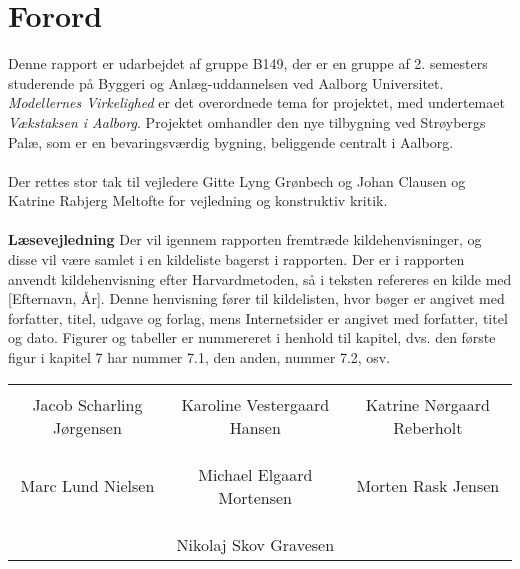 \chapter*{Forord}
Denne rapport er udarbejdet af gruppe B149, der er en gruppe af 2. semesters studerende på Byggeri og Anlæg-uddannelsen ved Aalborg Universitet. \textit{Modellernes Virkelighed} er det overordnede tema for projektet, med undertemaet \textit{Vækstaksen i Aalborg}. Projektet omhandler den nye tilbygning ved Strøybergs Palæ, som er en bevaringsværdig bygning, beliggende centralt i Aalborg. 
\\
\\
Der rettes stor tak til vejledere Gitte Lyng Grønbech og Johan Clausen og Katrine Rabjerg Meltofte for vejledning og konstruktiv kritik. 
\\
\\
\textbf{Læsevejledning}
\newline
Der vil igennem rapporten fremtræde kildehenvisninger, og disse vil være samlet i en kildeliste bagerst i rapporten. Der er i rapporten anvendt kildehenvisning efter Harvardmetoden, så i teksten refereres en kilde med [Efternavn, År]. Denne henvisning fører til kildelisten, hvor bøger er angivet med forfatter, titel, udgave og forlag, mens Internetsider er angivet med forfatter, titel og dato. Figurer og tabeller er nummereret i henhold til kapitel, dvs. den første figur i kapitel 7 har nummer 7.1, den anden, nummer 7.2, osv. 

\phantom{Luft}

\phantom{Luft}

\begin{table}[H]
	\centering
		\begin{tabular}{c c c}
			\underline{\phantom{mmmmmmmmmmmmmm}} & \underline{\phantom{mmmmmmmmmmmmmm}} & \underline{\phantom{mmmmmmmmmmmmmm}} \\
			Jacob Scharling Jørgensen			& Karoline Vestergaard Hansen 		& Katrine Nørgaard Reberholt 			\\
			&&\\
			&&\\
			\underline{\phantom{mmmmmmmmmmmmmm}} & \underline{\phantom{mmmmmmmmmmmmmm}} & \underline{\phantom{mmmmmmmmmmmmmm}} \\
			Marc Lund Nielsen			& Michael Elgaard Mortensen 		& Morten Rask Jensen 				\\
			&&\\
			&&\\
		& \underline{\phantom{mmmmmmmmmmmmmm}} 	&			\\														
		& Nikolaj Skov Gravesen 							& 					
		\end{tabular}
\end{table}